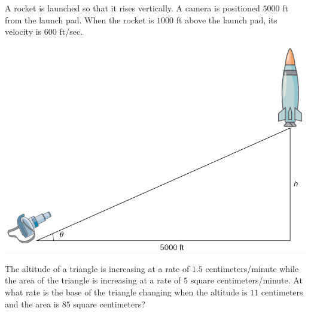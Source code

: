 \begin{example}

A rocket is launched so that it rises vertically. A camera is positioned
\(5000\) ft from the launch pad. When the rocket is \(1000\) ft above
the launch pad, its velocity is \(600\) ft/sec.

\includegraphics[scale=0.6]{img/4.1.3.png}

\end{example}
\vspace*{6\baselineskip}

\begin{example}

The altitude of a triangle is increasing at a rate of \(1.5\)
centimeters/minute while the area of the triangle is increasing at a
rate of \(5\) square centimeters/minute. At what rate is the base of the
triangle changing when the altitude is \(11\) centimeters and the area
is \(85\) square centimeters?

\end{example}
\vspace*{6\baselineskip}


